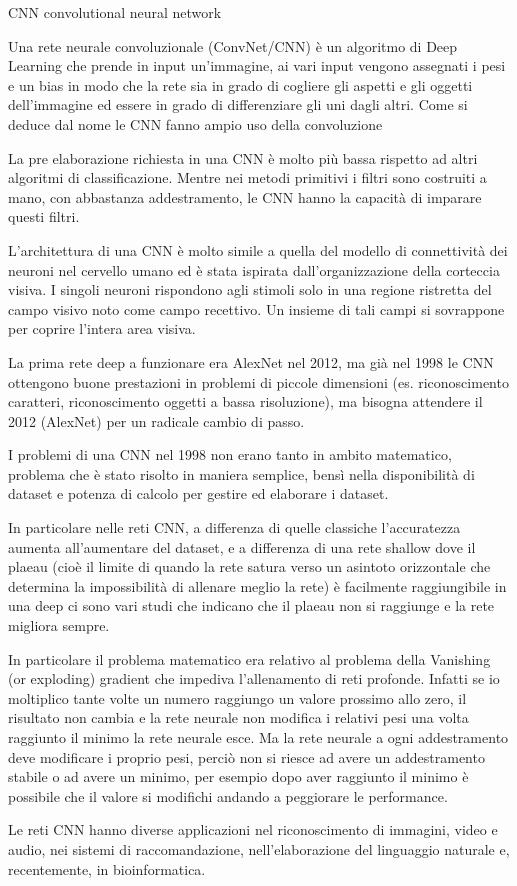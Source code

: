 \makeglossaries

 {CNN} {convolutional neural network}
{
    Una rete neurale convoluzionale (ConvNet/CNN) è un algoritmo di Deep Learning che prende in input un'immagine, ai vari input vengono assegnati i pesi e un bias in modo che la rete sia in grado di cogliere gli aspetti e gli oggetti dell'immagine ed essere in grado di differenziare gli uni dagli altri. Come si deduce dal nome le CNN fanno ampio uso della \gls{convoluzione}

    La pre elaborazione richiesta in una CNN è molto più bassa rispetto ad altri algoritmi di classificazione. Mentre nei metodi primitivi i filtri sono costruiti a mano, con abbastanza addestramento, le CNN hanno la capacità di imparare questi filtri.

    L'architettura di una CNN è molto simile a quella del modello di connettività dei neuroni nel cervello umano ed è stata ispirata dall'organizzazione della corteccia visiva. I singoli neuroni rispondono agli stimoli solo in una regione ristretta del campo visivo noto come campo recettivo. Un insieme di tali campi si sovrappone per coprire l'intera area visiva.

    La prima rete deep a funzionare era AlexNet nel 2012, ma già nel 1998 le CNN ottengono buone prestazioni in problemi di
    piccole dimensioni (es. riconoscimento caratteri, riconoscimento
    oggetti a bassa risoluzione), ma bisogna attendere il 2012
    (AlexNet) per un radicale cambio di passo.

    I problemi di una CNN nel 1998 non erano tanto in ambito matematico, problema che è stato risolto in maniera semplice, bensì nella disponibilità di dataset e potenza di calcolo per gestire ed elaborare i dataset.

    In particolare nelle reti CNN, a differenza di quelle classiche l'accuratezza aumenta all'aumentare del dataset, e a differenza di una rete shallow dove il  plaeau (cioè il limite di quando la rete satura verso un asintoto orizzontale che determina la impossibilità di allenare meglio la rete) è facilmente raggiungibile in una deep ci sono vari studi che indicano che il plaeau non si raggiunge e la rete migliora sempre.

    In particolare il problema matematico era relativo al problema della Vanishing (or exploding) gradient che impediva l'allenamento di reti profonde. Infatti se io moltiplico tante volte un numero raggiungo un valore prossimo allo zero, il risultato non cambia e la rete neurale non modifica i relativi pesi una volta raggiunto il minimo la rete neurale esce. Ma la rete neurale a ogni addestramento deve modificare i proprio pesi,  perciò non si riesce ad avere un addestramento stabile o ad avere un minimo, per esempio dopo aver raggiunto il minimo  è possibile che il valore si modifichi andando a peggiorare le performance.

    Le reti CNN hanno diverse applicazioni nel riconoscimento di immagini,  video e audio, nei sistemi di raccomandazione, nell’elaborazione del
    linguaggio naturale e, recentemente, in bioinformatica.
}

